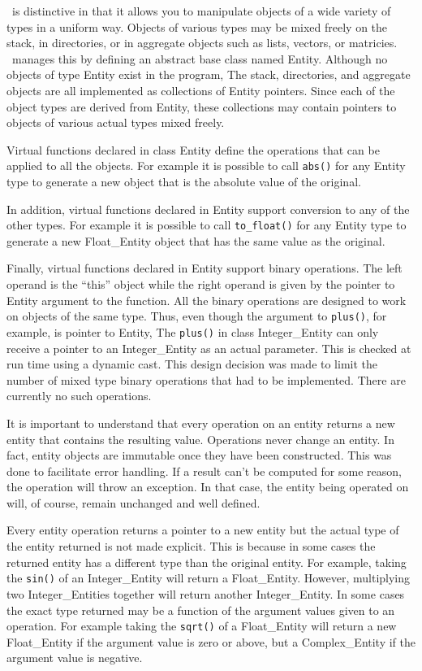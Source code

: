 \documentclass{report}
\begin{document}
\CLAC\ is distinctive in that it allows you to manipulate objects of a wide variety of types in
a uniform way. Objects of various types may be mixed freely on the stack, in directories, or in
aggregate objects such as lists, vectors, or matricies. \CLAC\ manages this by defining an
abstract base class named Entity. Although no objects of type Entity exist in the program, The
stack, directories, and aggregate objects are all implemented as collections of Entity pointers.
Since each of the object types are derived from Entity, these collections may contain pointers
to objects of various actual types mixed freely.

Virtual functions declared in class Entity define the operations that can be applied to all the
objects. For example it is possible to call \texttt{abs()} for any Entity type to generate a new
object that is the absolute value of the original.

In addition, virtual functions declared in Entity support conversion to any of the other types.
For example it is possible to call \texttt{to\_float()} for any Entity type to generate a new
Float\_Entity object that has the same value as the original.

Finally, virtual functions declared in Entity support binary operations. The left operand is the
``this'' object while the right operand is given by the pointer to Entity argument to the
function. All the binary operations are designed to work on objects of the same type. Thus, even
though the argument to \texttt{plus()}, for example, is pointer to Entity, The \texttt{plus()}
in class Integer\_Entity can only receive a pointer to an Integer\_Entity as an actual
parameter. This is checked at run time using a dynamic cast. This design decision was made to
limit the number of mixed type binary operations that had to be implemented. There are currently
no such operations.

It is important to understand that every operation on an entity returns a new entity that
contains the resulting value. Operations never change an entity. In fact, entity objects are
immutable once they have been constructed. This was done to facilitate error handling. If a
result can't be computed for some reason, the operation will throw an exception. In that case,
the entity being operated on will, of course, remain unchanged and well defined.

Every entity operation returns a pointer to a new entity but the actual type of the entity
returned is not made explicit. This is because in some cases the returned entity has a different
type than the original entity. For example, taking the \texttt{sin()} of an Integer\_Entity will
return a Float\_Entity. However, multiplying two Integer\_Entities together will return another
Integer\_Entity. In some cases the exact type returned may be a function of the argument values
given to an operation. For example taking the \texttt{sqrt()} of a Float\_Entity will return a
new Float\_Entity if the argument value is zero or above, but a Complex\_Entity if the argument
value is negative.
\end{document}
